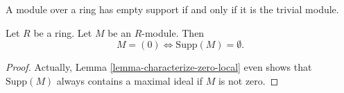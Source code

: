 \begin{lemma}
\label{lemma-support-zero}
\begin{slogan}
A module over a ring has empty support if and only if it is the trivial module.
\end{slogan}
Let $R$ be a ring. Let $M$ be an $R$-module. Then
$$
M = (0) \Leftrightarrow \text{Supp}(M) = \emptyset.
$$
\end{lemma}

\begin{proof}
Actually,
Lemma \ref{lemma-characterize-zero-local}
even shows that $\text{Supp}(M)$ always contains a maximal ideal
if $M$ is not zero.
\end{proof}